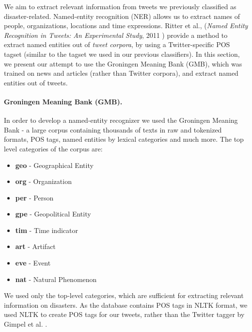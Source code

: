\documentclass[letterpaper,twocolumn,10pt]{article}
\begin{document}
We aim to extract relevant information from tweets we previously classified as disaster-related. Named-entity recognition (NER) allows us to extract names of people, organizations, locations and time expressions. Ritter et al., (\textit{Named Entity Recognition in Tweets: An Experimental Study}, 2011 \cite{Ritter11}) provide a method to extract named entities out of \textit{tweet corpora}, by using a Twitter-specific POS tagset (similar to the tagset we used in our previous classifiers). In this section, we present our attempt to use the Groningen Meaning Bank (GMB), which was trained on news and articles (rather than Twitter corpora), and extract named entities out of tweets.

\paragraph{Groningen Meaning Bank (GMB).}
In order to develop a named-entity recognizer we used the Groningen Meaning Bank - a large corpus containing thousands of texts in raw and tokenized formats, POS tags, named entities by lexical categories and much more. The top level categories of the corpus are:

\begin{itemize}[noitemsep, nolistsep]
	\item \textbf{geo} - Geographical Entity
	\item \textbf{org} - Organization
	\item \textbf{per} - Person
	\item \textbf{gpe} - Geopolitical Entity
	\item \textbf{tim} - Time indicator
	\item \textbf{art} - Artifact
	\item \textbf{eve} - Event
	\item \textbf{nat} - Natural Phenomenon
\end{itemize}

We used only the top-level categories, which are sufficient for extracting relevant information on disasters. As the database contains POS tags in NLTK format, we used NLTK to create POS tags for our tweets, rather than the Twitter tagger by Gimpel et al. \cite{POS-Tagging}.
\end{document}
